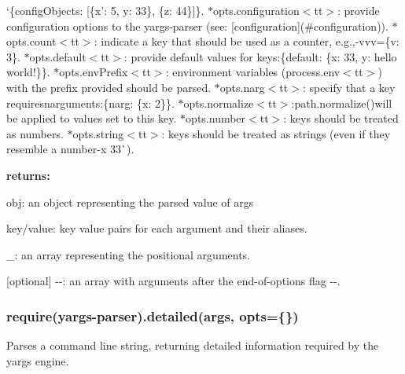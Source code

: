 \begin{DoxyItemize}
\begin{DoxyItemize}
 `\{config\+Objects\+: \mbox{[}\{\textquotesingle{}x'\+: 5, \textquotesingle{}y\textquotesingle{}\+: 33\}, \{\textquotesingle{}z\textquotesingle{}\+: 44\}\mbox{]}\}{\ttfamily . $\ast$}opts.\+configuration$<$tt$>$\+: provide configuration options to the yargs-\/parser (see\+: \mbox{[}configuration\mbox{]}(\#configuration)). $\ast$opts.\+count$<$tt$>$\+: indicate a key that should be used as a counter, e.\+g.,-\/vvv{\ttfamily =}\{v\+: 3\}{\ttfamily . $\ast$}opts.\+default$<$tt$>$\+: provide default values for keys\+:\{default\+: \{x\+: 33, y\+: \textquotesingle{}hello world!\textquotesingle{}\}\}{\ttfamily . $\ast$}opts.\+env\+Prefix$<$tt$>$\+: environment variables (process.\+env$<$tt$>$) with the prefix provided should be parsed. $\ast$opts.\+narg$<$tt$>$\+: specify that a key requiresn{\ttfamily arguments\+:}\{narg\+: \{x\+: 2\}\}{\ttfamily . $\ast$}opts.\+normalize$<$tt$>$\+:path.\+normalize(){\ttfamily will be applied to values set to this key. $\ast$}opts.\+number$<$tt$>$\+: keys should be treated as numbers. $\ast$opts.\+string$<$tt$>$\+: keys should be treated as strings (even if they resemble a number-\/x 33\`{}).
\end{DoxyItemize}
\end{DoxyItemize}

{\bfseries returns\+:}


\begin{DoxyItemize}
\item {\ttfamily obj}\+: an object representing the parsed value of {\ttfamily args}
\begin{DoxyItemize}
\item {\ttfamily key/value}\+: key value pairs for each argument and their aliases.
\item {\ttfamily \+\_\+}\+: an array representing the positional arguments.
\item \mbox{[}optional\mbox{]} {\ttfamily -\/-\/}\+: an array with arguments after the end-\/of-\/options flag {\ttfamily -\/-\/}.
\end{DoxyItemize}
\end{DoxyItemize}

\subsubsection*{require(\textquotesingle{}yargs-\/parser\textquotesingle{}).detailed(args, opts=\{\})}

Parses a command line string, returning detailed information required by the yargs engine.

